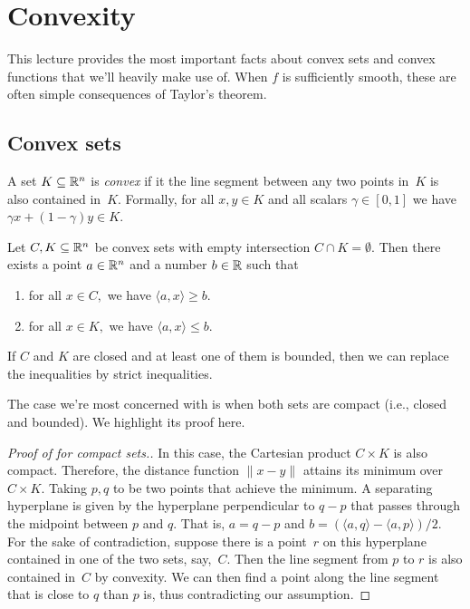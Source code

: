 
\section{Convexity}

This lecture provides the most important facts about convex sets and convex
functions that we'll heavily make use of. When $f$ is sufficiently smooth, these are often simple consequences of
Taylor's theorem. 

\subsection{Convex sets}

\begin{definition}
A set $K\subseteq\mathbb{R}^n$ is \emph{convex} if it the line segment between any two points in~$K$ is also contained in~$K.$ Formally, for all $x,y\in K$ and all scalars $\gamma\in[0,1]$ we have $\gamma x+(1-\gamma)y\in K.$
\end{definition}

\begin{theorem}
Let $C, K\subseteq\mathbb{R}^n$ be convex sets with empty intersection $C\cap K=\emptyset.$ Then there exists a point $a\in\mathbb{R}^n$ and a number $b\in\mathbb{R}$ such that
\begin{enumerate}
\item for all $x\in C,$ we have $\langle a, x\rangle \ge b.$
\item for all $x\in K,$ we have $\langle a, x\rangle \le b.$
\end{enumerate}
If $C$ and $K$ are closed and at least one of them is bounded, then we can replace the inequalities by strict inequalities.
\end{theorem}
The case we're most concerned with is when both sets are compact (i.e., closed and bounded). We highlight its proof here.
\begin{proof}[Proof of  for compact sets.]
In this case, the Cartesian product $C\times K$ is also compact. Therefore, the
distance function $\|x-y\|$ attains its minimum over $C\times K.$ Taking $p, q$
to be two points that achieve the minimum. A separating hyperplane is given by
the hyperplane perpendicular to $q-p$ that passes through the midpoint between
$p$ and $q.$ That is, $a=q-p$ and $b=(\langle a, q\rangle - \langle a,
p\rangle)/2.$ For the sake of contradiction, suppose there is a point~$r$ on
this hyperplane contained in one of the two sets, say,~$C.$ Then the line
segment from $p$ to $r$ is also contained in~$C$ by convexity. We can then find
a point along the line segment that is close to $q$ than $p$ is, thus
contradicting our assumption.
\end{proof}

